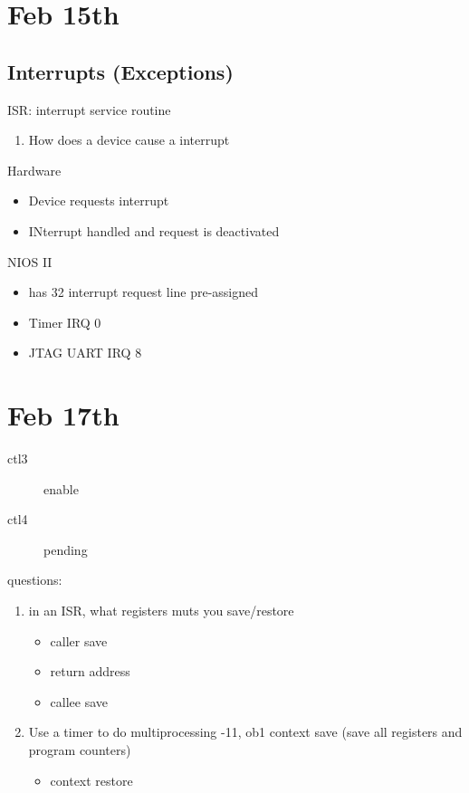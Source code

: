 \documentclass[11pt]{article}
\begin{document}
\section{Feb 15th}
\label{sec:orgheadline73}
\subsection{Interrupts (Exceptions)}
\label{sec:orgheadline72}
ISR: interrupt service routine
\begin{enumerate}
\item How does a device cause a interrupt
\end{enumerate}
Hardware
\begin{itemize}
\item Device requests interrupt
\item INterrupt handled and request is deactivated
\end{itemize}

NIOS II
\begin{itemize}
\item has 32 interrupt request line pre-assigned
\item Timer IRQ 0
\item JTAG UART IRQ 8
\end{itemize}

\section{Feb 17th}
\label{sec:orgheadline76}
\begin{description}
\item[{ctl3}] enable
\item[{ctl4}] pending
\end{description}
questions:
\begin{enumerate}
\item in an ISR, what registers muts you save/restore
\begin{itemize}
\item caller save
\item return address
\item callee save
\end{itemize}
\item Use a timer to do multiprocessing
-11, ob1 context save (save all registers and program counters)
\begin{itemize}
\item context restore
\end{itemize}
\end{enumerate}
\end{document}
